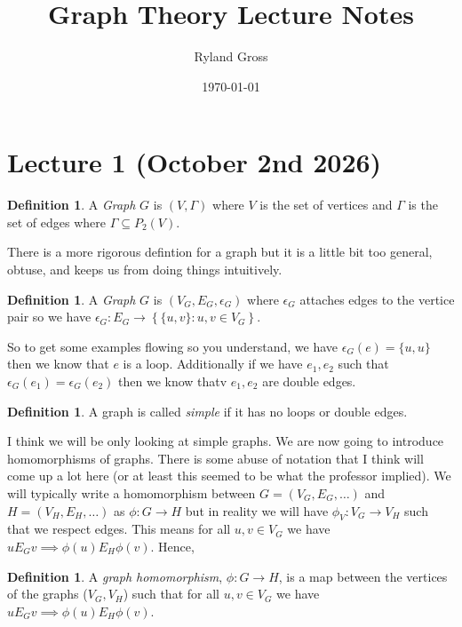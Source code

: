\documentclass[11pt,a4paper]{article}
\title{Graph Theory Lecture Notes}
\author{Ryland Gross}
\date{\today}
\theoremstyle{plain}
\theoremstyle{definition}
\newtheorem{definition}[theorem]{Definition}
\theoremstyle{remark}
\begin{document}
\maketitle

\section{Lecture 1 (October 2nd 2026)}

\begin{definition}
    A \emph{Graph} $G$ is $(V, \Gamma)$ where $V$ is the set of vertices and $\Gamma$ is the set of edges where $\Gamma \subseteq P_2(V)$.
\end{definition}

\noindent
There is a more rigorous defintion for a graph but it is a little bit too general, obtuse, and keeps us from doing things intuitively.

\begin{definition}
    A \emph{Graph} $G$ is $(V_G, E_G, \epsilon_G)$ where $\epsilon_G$ attaches edges to the vertice pair so we have $\epsilon_G: E_G \to \left\{\{u,v\} : u,v \in V_G\right\}$.
\end{definition}

\noindent
So to get some examples flowing so you understand, we have $\epsilon_G(e) = \{u,u\}$ then we know that $e$ is a loop. Additionally if we have $e_1, e_2$ such that $\epsilon_G(e_1) = \epsilon_G(e_2)$ then we know thatv $e_1, e_2$ are double edges. 

\begin{definition}
    A graph is called \emph{simple} if it has no loops or double edges. 
\end{definition}

\noindent
I think we will be only looking at simple graphs. We are now going to introduce homomorphisms of graphs. There is some abuse of notation that I think will come up a lot here (or at least this seemed to be what the professor implied). We will typically write a homomorphism between $G = (V_G, E_G, \dots)$ and $H = (V_H, E_H, \dots)$ as $\phi: G \to H$ but in reality we will have $\phi_V: V_G \to V_H$ such that we respect edges. This means for all $u, v \in V_G$ we have $uE_Gv \implies \phi(u)E_H\phi(v)$. Hence,

\begin{definition}
    A \emph{graph homomorphism}, $\phi:G \to H$, is a map between the vertices of the graphs ($V_G, V_H$) such that for all $u, v \in V_G$ we have $uE_Gv \implies \phi(u)E_H\phi(v)$. 
\end{definition}
\end{document}
